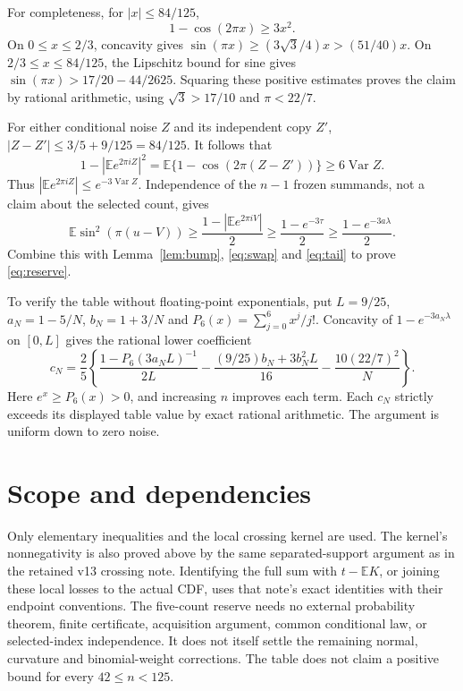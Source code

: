 \documentclass[11pt]{article}
\newcommand{\E}{\mathbb E}\newcommand{\Pp}{\mathbb P}
\begin{document}
For completeness, for $|x|\le84/125$,
\[
1-\cos(2\pi x)\ge3x^2.
\]
On $0\le x\le2/3$, concavity gives
$\sin(\pi x)\ge(3\sqrt3/4)x>(51/40)x$.
On $2/3\le x\le84/125$, the Lipschitz bound for sine gives
$\sin(\pi x)>17/20-44/2625$.
Squaring these positive estimates proves the claim by rational
arithmetic, using $\sqrt3>17/10$ and $\pi<22/7$.

For either conditional noise $Z$ and its independent copy $Z'$,
$|Z-Z'|\le3/5+9/125=84/125$. It follows that
\[
1-|\E e^{2\pi iZ}|^2
=\E\{1-\cos(2\pi(Z-Z'))\}\ge6\operatorname{Var}Z.
\]
Thus $|\E e^{2\pi iZ}|\le e^{-3\operatorname{Var}Z}$. Independence
of the $n-1$ frozen summands, not a claim about the selected count, gives
\[
\E\sin^2(\pi(u-V))
\ge\frac{1-|\E e^{2\pi iV}|}{2}
\ge\frac{1-e^{-3\tau}}2
\ge\frac{1-e^{-3a\lambda}}2.
\]
Combine this with Lemma~\ref{lem:bump}, \eqref{eq:swap}
and \eqref{eq:tail} to prove \eqref{eq:reserve}.

To verify the table without floating-point exponentials, put $L=9/25$,
$a_N=1-5/N$, $b_N=1+3/N$ and
$P_6(x)=\sum_{j=0}^6x^j/j!$.
Concavity of $1-e^{-3a_N\lambda}$ on $[0,L]$ gives the rational lower
coefficient
\[
c_N=\frac25\left\{
\frac{1-P_6(3a_NL)^{-1}}{2L}
-\frac{(9/25)b_N+3b_N^2L}{16}
-\frac{10(22/7)^2}{N}\right\}.
\]
Here $e^x\ge P_6(x)>0$, and increasing $n$ improves each term.
Each $c_N$ strictly exceeds its displayed table value by exact rational
arithmetic. The argument is uniform down to zero noise.

\section*{Scope and dependencies}
Only elementary inequalities and the local crossing kernel are used.
The kernel's nonnegativity is also proved above by the same separated-support
argument as in the retained v13 crossing note. Identifying the full sum
with $t-\E K$, or joining these local losses to the actual CDF, uses that
note's exact identities with their endpoint conventions.
The five-count reserve needs no external probability theorem, finite
certificate, acquisition argument, common conditional law, or selected-index
independence. It does not itself settle the remaining normal, curvature and
binomial-weight corrections. The table does not claim a positive bound
for every $42\le n<125$.
\end{document}
